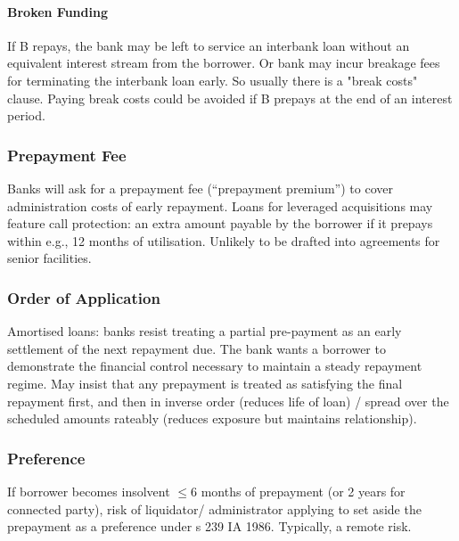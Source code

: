 \documentclass[
]{article}
\begin{document}
\hypertarget{broken-funding}{%
\paragraph{Broken Funding}\label{broken-funding}}

If B repays, the bank may be left to service an interbank loan without
an equivalent interest stream from the borrower. Or bank may incur
breakage fees for terminating the interbank loan early. So usually there
is a "break costs" clause. Paying break costs could be avoided if B
prepays at the end of an interest period.

\hypertarget{prepayment-fee}{%
\subsubsection{Prepayment Fee}\label{prepayment-fee}}

Banks will ask for a prepayment fee (``prepayment premium'') to cover
administration costs of early repayment. Loans for leveraged
acquisitions may feature call protection: an extra amount payable by the
borrower if it prepays within e.g., 12 months of utilisation. Unlikely
to be drafted into agreements for senior facilities.

\hypertarget{order-of-application}{%
\subsubsection{Order of Application}\label{order-of-application}}

Amortised loans: banks resist treating a partial pre-payment as an early
settlement of the next repayment due. The bank wants a borrower to
demonstrate the financial control necessary to maintain a steady
repayment regime. May insist that any prepayment is treated as
satisfying the final repayment first, and then in inverse order (reduces
life of loan) / spread over the scheduled amounts rateably (reduces
exposure but maintains relationship).

\hypertarget{preference}{%
\subsubsection{Preference}\label{preference}}

If borrower becomes insolvent {\(\leq 6\)} months of prepayment (or 2
years for connected party), risk of liquidator/ administrator applying
to set aside the prepayment as a preference under s 239 IA 1986.
Typically, a remote risk.
\end{document}
